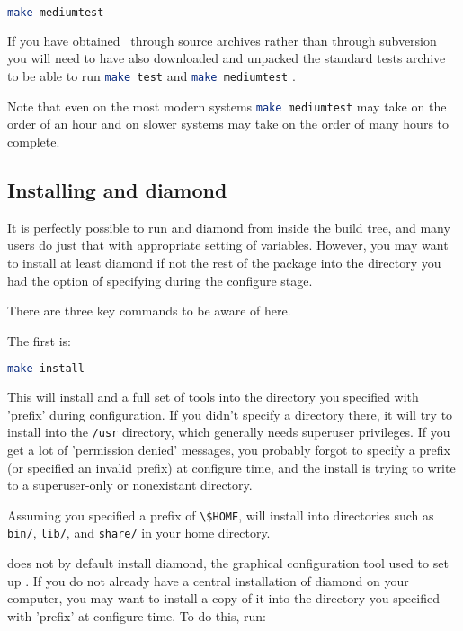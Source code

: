 \begin{lstlisting}[language=Bash]
make mediumtest
\end{lstlisting}

If you have obtained \fluidity\ through source archives rather than through
subversion you will need to have also downloaded and unpacked the standard
tests archive to be able to run \lstinline[language=Bash]+make test+ and
\lstinline[language=Bash]+make mediumtest+ .

Note that even on the most modern systems
\lstinline[language=Bash]+make mediumtest+ may take on the order of an hour and
on slower systems may take on the order of many hours to complete.

\subsection{Installing \fluidity and diamond}
\label{sec:installing_fluidity}

It is perfectly possible to run \fluidity and diamond from inside the build
tree, and many users do just that with appropriate setting of variables.
However, you may want to install at least diamond if not the rest of the
\fluidity package into the directory you had the option of specifying during
the configure stage.

There are three key commands to be aware of here.

The first is:

\begin{lstlisting}[language=Bash]
make install
\end{lstlisting}

This will install \fluidity and a full set of \fluidity tools into the
directory you specified with 'prefix' during configuration. If you didn't
specify a directory there, it will try to install into the
\lstinline[language=Bash]+/usr+ directory, which generally needs superuser
privileges. If you get a lot of 'permission denied' messages, you probably
forgot to specify a prefix (or specified an invalid prefix) at configure time,
and the install is trying to write to a superuser-only or nonexistant
directory.

Assuming you specified a prefix of \lstinline[language=Bash]+\$HOME+, \fluidity
will install into directories such as \lstinline[language=Bash]+bin/+,
\lstinline[language=Bash]+lib/+, and \lstinline[language=Bash]+share/+ in your
home directory.

\fluidity does not by default install diamond, the graphical configuration tool
used to set up \fluidity. If you do not already have a central installation of
diamond on your computer, you may want to install a copy of it into the
directory you specified with 'prefix' at configure time. To do this, run:

